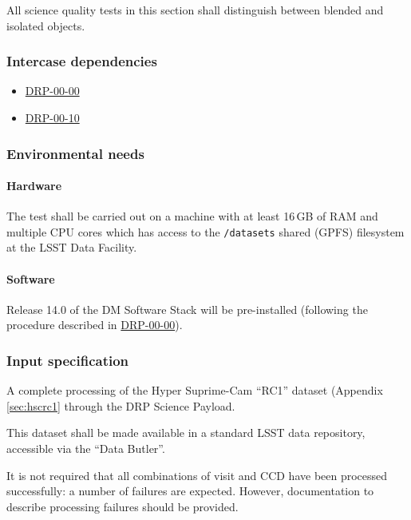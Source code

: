 All science quality tests in this section shall distinguish between blended and isolated objects.

\subsubsection{Intercase dependencies}

\begin{itemize}

  \item{\hyperref[drp-00-00]{DRP-00-00}}
  \item{\hyperref[drp-00-10]{DRP-00-10}}

\end{itemize}

\subsubsection{Environmental needs}

\paragraph{Hardware}

The test shall be carried out on a machine with at least 16\,GB of RAM and
multiple CPU cores which has access to the \texttt{/datasets} shared (GPFS)
filesystem at the LSST Data Facility.

\paragraph{Software}

Release 14.0 of the DM Software Stack will be pre-installed (following the
procedure described in \hyperref[drp-00-00]{DRP-00-00}).

\subsubsection{Input specification}

A complete processing of the Hyper Suprime-Cam ``RC1'' dataset (Appendix
\ref{sec:hscrc1} through the DRP Science Payload.

This dataset shall be made available in a standard LSST data repository,
accessible via the ``Data Butler''.

It is not required that all combinations of visit and CCD have been processed
successfully: a number of failures are expected. However, documentation to
describe processing failures should be provided.

